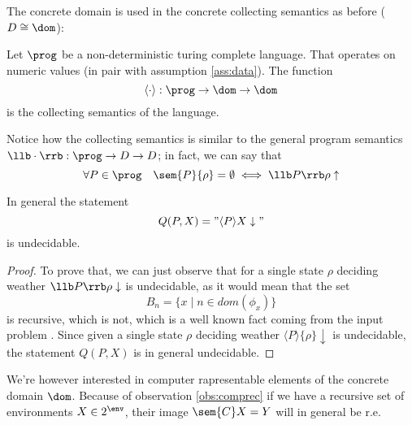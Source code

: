 The concrete domain is used in the concrete collecting semantics as
before (\(D \cong \dom\)):

\begin{definition}\label{def:collecting}
  Let \(\prog\) be a non-deterministic turing complete language. That
  operates on numeric values (in pair with assumption
  \ref{ass:data}). The function \[\langle \cdot \rangle : \prog \to
  \dom \to \dom\] is the collecting semantics of the language.
\end{definition}

Notice how the collecting semantics is similar to the general program
semantics \(\llb \cdot \rrb : \prog \to D \to D\); in fact, we can say
that \[\forall P \in \prog \quad \sem{P} \{\rho\} = \emptyset \iff
\llb P \rrb \rho \uparrow\]

\begin{lemma}\label{le:collectingundec}
  In general the statement \[Q(P,X) = "\langle P \rangle X
  \downarrow"\] is undecidable.
\end{lemma}

\begin{proof}
  To prove that, we can just observe that for a single state \(\rho\)
  deciding weather \(\llb P \rrb \rho \downarrow\) is undecidable, as
  it would mean that the set \[B_n = \{x \mid n \in dom(\phi_x)\}\] is
  recursive, which is not, which is a well known fact coming from the
  input problem \cite[p.~104]{cutland1980computability}. Since given a
  single state \(\rho\) deciding weather \(\langle P
  \rangle\{\rho\}\downarrow\) is undecidable, the statement \(Q(P,X)\)
  is in general undecidable.
\end{proof}

We're however interested in computer rapresentable elements of the
concrete domain \(\dom\). Because of observation \ref{obs:comprec} if
we have a recursive set of environments \(X\in2^\env\), their image
\(\sem{C}X = Y\) will in general be r.e.
